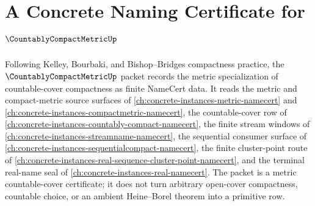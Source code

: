 \chapter{A Concrete Naming Certificate for $\CountablyCompactMetricUp$}
\label{ch:concrete-instances-countably-compact-metric-namecert}

Following Kelley, Bourbaki, and Bishop--Bridges compactness practice, the $\CountablyCompactMetricUp$ packet records the metric specialization of countable-cover compactness as finite NameCert data. It reads the metric and compact-metric source surfaces of \autoref{ch:concrete-instances-metric-namecert} and \autoref{ch:concrete-instances-compactmetric-namecert}, the countable-cover row of \autoref{ch:concrete-instances-countably-compact-namecert}, the finite stream windows of \autoref{ch:concrete-instances-streamname-namecert}, the sequential consumer surface of \autoref{ch:concrete-instances-sequentialcompact-namecert}, the finite cluster-point route of \autoref{ch:concrete-instances-real-sequence-cluster-point-namecert}, and the terminal real-name seal of \autoref{ch:concrete-instances-real-namecert}. The packet is a metric countable-cover certificate; it does not turn arbitrary open-cover compactness, countable choice, or an ambient Heine--Borel theorem into a primitive row.

